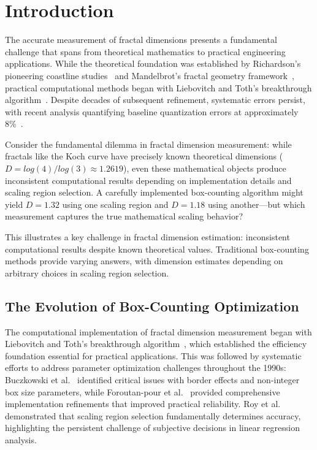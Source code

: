\documentclass[preprint,12pt]{elsarticle}
\def\log{log}%
\begin{document}

\section{Introduction}
\label{sec:introduction}

The accurate measurement of fractal dimensions presents a fundamental challenge that spans from theoretical mathematics to practical engineering applications. While the theoretical foundation was established by Richardson's pioneering coastline studies~\cite{richardson1961} and Mandelbrot's fractal geometry framework~\cite{mandelbrot1967}, practical computational methods began with Liebovitch and Toth's breakthrough algorithm~\cite{liebovitch1989}. Despite decades of subsequent refinement, systematic errors persist, with recent analysis quantifying baseline quantization errors at approximately 8\%~\cite{bouda2016}.

Consider the fundamental dilemma in fractal dimension measurement: while fractals like the Koch curve have precisely known theoretical dimensions ($D = \log(4)/\log(3) \approx 1.2619$), even these mathematical objects produce inconsistent computational results depending on implementation details and scaling region selection. A carefully implemented box-counting algorithm might yield $D = 1.32$ using one scaling region and $D = 1.18$ using another—but which measurement captures the true mathematical scaling behavior?

This illustrates a key challenge in fractal dimension estimation: inconsistent computational results despite known theoretical values. Traditional box-counting methods provide varying answers, with dimension estimates depending on arbitrary choices in scaling region selection.

\subsection{The Evolution of Box-Counting Optimization}

The computational implementation of fractal dimension measurement began with Liebovitch and Toth's breakthrough algorithm~\cite{liebovitch1989}, which established the efficiency foundation essential for practical applications. This was followed by systematic efforts to address parameter optimization challenges throughout the 1990s: Buczkowski et al.~\cite{buczkowski1998} identified critical issues with border effects and non-integer box size parameters, while Foroutan-pour et al.~\cite{foroutan1999} provided comprehensive implementation refinements that improved practical reliability. Roy et al.~\cite{roy2007} demonstrated that scaling region selection fundamentally determines accuracy, highlighting the persistent challenge of subjective decisions in linear regression analysis.
\end{document}
